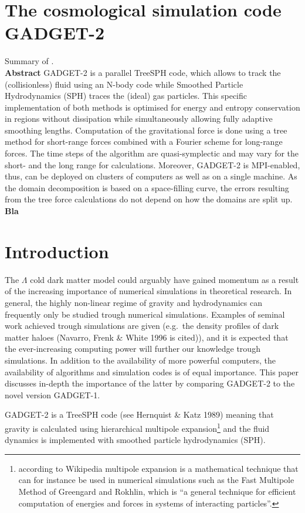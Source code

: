 \documentclass[MScProj_TLRH_ClusterEnergy.tex]{subfiles}
\begin{document}
\section*{The cosmological simulation code GADGET-2}
\label{sec:Springel2005}
Summary of \citet{2005MNRAS.364.1105S}.
\\
\textbf{Abstract}
GADGET-2 is a parallel TreeSPH code, which allows to track the (collisionless) fluid using an N-body code while Smoothed Particle Hydrodynamics (SPH) traces the (ideal) gas particles. This specific implementation of both methods is optimised for energy and entropy conservation in regions without dissipation while simultaneously allowing fully adaptive smoothing lengths. Computation of the gravitational force is done using a tree method for short-range forces combined with a Fourier scheme for long-range forces. The time steps of the algorithm are quasi-symplectic and may vary for the short- and the long range for calculations. Moreover, GADGET-2 is MPI-enabled, thus, can be deployed on clusters of computers as well as on a single machine. As the domain decomposition is based on a space-filling curve, the errors resulting from the tree force calculations do not depend on how the domains are split up.
\\
\textbf{Bla}

\section{Introduction}
The $\Lambda$ cold dark matter model could arguably have gained momentum as a result of the increasing importance of numerical simulations in theoretical research. In general, the highly non-linear regime of gravity and hydrodynamics can frequently only be studied trough numerical simulations. Examples of seminal work achieved trough simulations are given (e.g.\ the density profiles of dark matter haloes (Navarro, Frenk \& White 1996 is cited)), and it is expected that the ever-increasing computing power will further our knowledge trough simulations. In addition to the availability of more powerful computers, the availability of algorithms and simulation codes is of equal importance. This paper discusses in-depth the importance of the latter by comparing GADGET-2 to the novel version GADGET-1.

GADGET-2 is a TreeSPH code (see Hernquist \& Katz 1989) meaning that gravity is calculated using hierarchical multipole expansion\footnote{according to Wikipedia multipole expansion is a mathematical technique that can for instance be used in numerical simulations such as the Fast Multipole Method of Greengard and Rokhlin, which is ``a general technique for efficient computation of energies and forces in systems of interacting particles''.} %
and the fluid dynamics is implemented with smoothed particle hydrodynamics (SPH).




\SubfileBibliography
\end{document}
